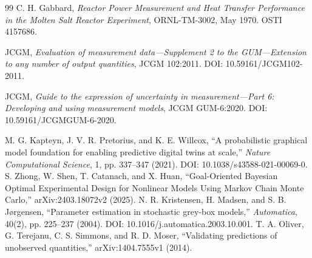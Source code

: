 \begin{thebibliography}{99}
C. H. Gabbard, \emph{Reactor Power Measurement and Heat Transfer Performance in the Molten Salt Reactor Experiment}, ORNL-TM-3002, May 1970. OSTI 4157686.

JCGM, \emph{Evaluation of measurement data---Supplement 2 to the GUM---Extension to any number of output quantities}, JCGM 102:2011. DOI: 10.59161/JCGM102-2011.

JCGM, \emph{Guide to the expression of uncertainty in measurement---Part 6: Developing and using measurement models}, JCGM GUM-6:2020. DOI: 10.59161/JCGMGUM-6-2020.


M. G. Kapteyn, J. V. R. Pretorius, and K. E. Willcox, ``A probabilistic graphical model foundation for enabling predictive digital twins at scale,'' \emph{Nature Computational Science}, 1, pp. 337--347 (2021). DOI: 10.1038/s43588-021-00069-0.
S. Zhong, W. Shen, T. Catanach, and X. Huan, ``Goal-Oriented Bayesian Optimal Experimental Design for Nonlinear Models Using Markov Chain Monte Carlo,'' arXiv:2403.18072v2 (2025).
N. R. Kristensen, H. Madsen, and S. B. J{\o}rgensen, ``Parameter estimation in stochastic grey-box models,'' \emph{Automatica}, 40(2), pp. 225--237 (2004). DOI: 10.1016/j.automatica.2003.10.001.
T. A. Oliver, G. Terejanu, C. S. Simmons, and R. D. Moser, ``Validating predictions of unobserved quantities,'' arXiv:1404.7555v1 (2014).

\end{thebibliography}
